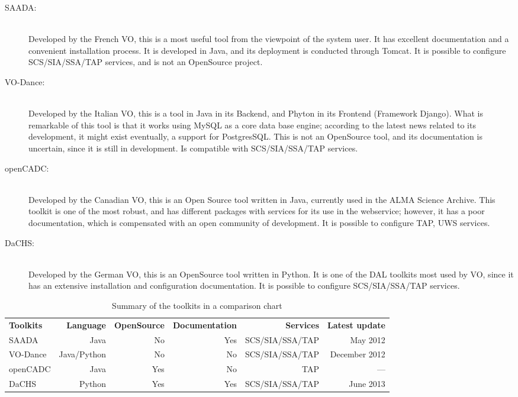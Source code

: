 \documentclass[]{spie}
\begin{document}
\begin{description}
    \item[SAADA:] \hfill \\
        Developed by the French VO, this is a most useful tool from the viewpoint of the system user.  It has excellent documentation and a convenient installation process. It is developed in Java, and its deployment is conducted through Tomcat.  It is possible to configure SCS/SIA/SSA/TAP services, and is not an OpenSource project.
    \item[VO-Dance:] \hfill \\
        Developed by the Italian VO, this is a tool in Java in its Backend, and Phyton in its Frontend (Framework Django). What is remarkable of this tool is that it works using MySQL as a core data base engine; according to the latest news related to its development, it might exist eventually, a support for PostgresSQL.  This is not an OpenSource tool, and its documentation is uncertain, since it is still in development.  Is compatible with SCS/SIA/SSA/TAP services.
    \item[openCADC:] \hfill \\
        Developed by the Canadian VO, this is an Open Source tool written in Java, currently used in the ALMA Science Archive.  This toolkit is one of the most robust, and has different packages with services for its use in the webservice; however, it has a poor documentation, which is compensated with an open community of development.  It is possible to configure TAP, UWS services.
    \item[DaCHS:] \hfill \\
        Developed by the German VO, this is an OpenSource tool written in Python.  It is one of the DAL toolkits most used by VO, since it has an extensive installation and configuration documentation. It is possible to configure SCS/SIA/SSA/TAP services.
\end{description}

\begin{table}[h]
\caption{Summary of the toolkits in a comparison chart} 
\label{table:toolkits}
\begin{center}       
\begin{tabular}{lrrrrr}
    {\bf Toolkits} & {\bf Language} & {\bf OpenSource} & {\bf Documentation} & {\bf Services} & {\bf Latest update}  \\
    SAADA          & Java           & No               & Yes                  & SCS/SIA/SSA/TAP & May 2012     \\
    VO-Dance       & Java/Python    & No               & No                  & SCS/SIA/SSA/TAP & December 2012 \\
    openCADC       & Java           & Yes               & No                  & TAP             & ---           \\
    DaCHS          & Python         & Yes               & Yes                  & SCS/SIA/SSA/TAP & June 2013    \\
\end{tabular}
\end{center}
\end{table}
\end{document}
